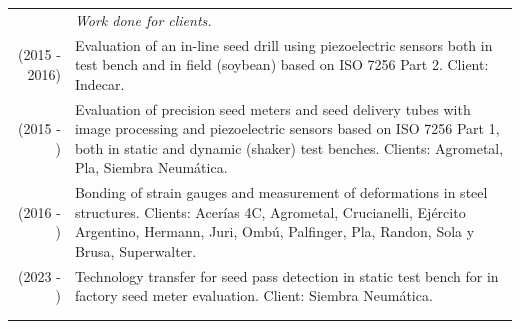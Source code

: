 \documentclass[a4paper,10pt, sans]{article}
\begin{document}
  
  \begin{table}[H]
  \centering
  \begin{tabularx}{\textwidth}{r X}  
  		
        {} & \hspace{2cm} \textit{Work done for clients.} \\ [1ex]
        (2015 - 2016) & Evaluation of an in-line seed drill using piezoelectric sensors both in test bench and in field (soybean) based on ISO 7256 Part 2. Client: Indecar. \\  [1ex]

        (2015 - ) & Evaluation of precision seed meters and seed delivery tubes with image processing and piezoelectric sensors based on ISO 7256 Part 1, both in static and dynamic (shaker) test benches. Clients: Agrometal, Pla, Siembra Neumática. \\ [1ex]
        (2016 - ) & Bonding of strain gauges and measurement of deformations in steel structures. Clients: Acerías 4C, Agrometal, Crucianelli, Ejército Argentino, Hermann, Juri, Ombú, Palfinger, Pla, Randon, Sola y Brusa, Superwalter. \\ 
        (2023 - ) & Technology transfer for seed pass detection in static test bench for in factory seed meter evaluation. Client: Siembra Neumática.\\ \\ \hline \\





\end{tabularx}
\end{table}
\end{document}
